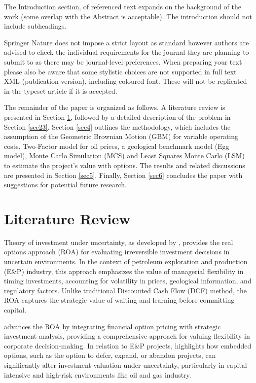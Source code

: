 \documentclass[pdflatex,sn-basic]{sn-jnl}%
\theoremstyle{thmstyleone}%
\theoremstyle{thmstyletwo}%
\theoremstyle{thmstylethree}%
\begin{document}
The Introduction section, of referenced text \cite{bib1} expands on the background of the work (some overlap with the Abstract is acceptable). The introduction should not include subheadings.

Springer Nature does not impose a strict layout as standard however authors are advised to check the individual requirements for the journal they are planning to submit to as there may be journal-level preferences. When preparing your text please also be aware that some stylistic choices are not supported in full text XML (publication version), including coloured font. These will not be replicated in the typeset article if it is accepted. 

The remainder of the paper is organized as follows. A literature review is presented in Section \ref{sec2}, followed by a detailed description of the problem in Section \ref{sec23}. Section \ref{sec4} outlines the methodology, which includes the assumption of the Geometric Brownian Motion (GBM) for variable operating costs, Two-Factor model for oil prices, a geological benchmark model (Egg model), Monte Carlo Simulation (MCS) and Least Squares Monte Carlo (LSM) to estimate the project's value with options. The results and related discussions are presented in Section \ref{sec5}. Finally, Section \ref{sec6} concludes the paper with suggestions for potential future research.

\section{Literature Review}\label{sec2}

Theory of investment under uncertainty, as developed by \cite{ref1}, provides the real options approach (ROA) for evaluating irreversible investment decisions in uncertain environments. In the context of petroleum exploration and production (E\&P) industry, this approach emphasizes the value of managerial flexibility in timing investments, accounting for volatility in prices, geological information, and regulatory factors. Unlike traditional Discounted Cash Flow (DCF) method, the ROA captures the strategic value of waiting and learning before committing capital.

\cite{ref2} advances the ROA by integrating financial option pricing with strategic investment analysis, providing a comprehensive approach for valuing flexibility in corporate decision-making. In relation to E\&P projects, \cite{ref2} highlights how embedded options, such as the option to defer, expand, or abandon projects, can significantly alter investment valuation under uncertainty, particularly in capital-intensive and high-risk environments like oil and gas industry.
\end{document}
